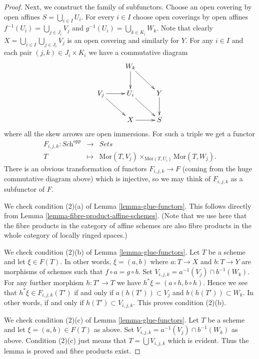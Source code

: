 \begin{proof}
\medskip\noindent
Next, we construct the family of subfunctors.
Choose an open covering by open affines
$S = \bigcup\nolimits_{i \in I} U_i$.
For every $i \in I$ choose open coverings by open affines
$f^{-1}(U_i) = \bigcup\nolimits_{j \in J_i} V_j$ and
$g^{-1}(U_i) = \bigcup\nolimits_{k \in K_i} W_k$.
Note that clearly $X = \bigcup_{i \in I} \bigcup_{j \in J_i} V_j$
is an open covering and similarly for $Y$.
For any $i \in I$ and each pair $(j, k) \in J_i \times K_i$
we have a commutative diagram
$$
\xymatrix{
    & W_k \ar[d] \ar[rd] &   \\
V_j \ar[rd] \ar[r] & U_i \ar[rd] & Y \ar[d] \\
    & X \ar[r]  & S
}
$$
where all the skew arrows are open immersions. For such a
triple we get a functor
\begin{eqnarray*}
F_{i,j,k} : \textit{Sch}^{opp} & \longrightarrow & \textit{Sets} \\
T & \longmapsto &
\text{Mor}(T, V_j) \times_{\text{Mor}(T, U_i)} \text{Mor}(T, W_j).
\end{eqnarray*}
There is an obvious transformation of functors $F_{i,j,k} \to F$
(coming from the huge commutative diagram above)
which is injective, so we may think of $F_{i,j,k}$ as a subfunctor
of $F$.

\medskip\noindent
We check condition (2)(a) of Lemma \ref{lemma-glue-functors}.
This follows directly from Lemma \ref{lemma-fibre-product-affine-schemes}.
(Note that we use here that the fibre products in the category of
affine schemes are also fibre products in the whole category of locally
ringed spaces.)

\medskip\noindent
We check condition (2)(b) of Lemma \ref{lemma-glue-functors}.
Let $T$ be a scheme and let $\xi \in F(T)$. In other words,
$\xi = (a, b)$ where $a : T \to X$ and $b : T \to Y$ are
morphisms of schemes such that $f \circ a = g \circ b$.
Set $V_{i,j,k} = a^{-1}(V_j) \cap b^{-1}(W_k)$. For any
further morphism $h : T' \to T$ we have
$h^*\xi = (a \circ h, b \circ h)$. Hence we see that
$h^*\xi \in F_{i,j,k}(T')$ if and only if
$a(h(T')) \subset V_j$ and $b(h(T')) \subset W_k$.
In other words, if and only if $h(T') \subset V_{i,j,k}$.
This proves condition (2)(b).

\medskip\noindent
We check condition (2)(c) of Lemma \ref{lemma-glue-functors}.
Let $T$ be a scheme and let $\xi = (a, b) \in F(T)$ as above.
Set $V_{i,j,k} = a^{-1}(V_j) \cap b^{-1}(W_k)$ as above.
Condition (2)(c) just means that $T = \bigcup V_{i,j,k}$
which is evident. Thus the lemma is proved and fibre products
exist.
\end{proof}

